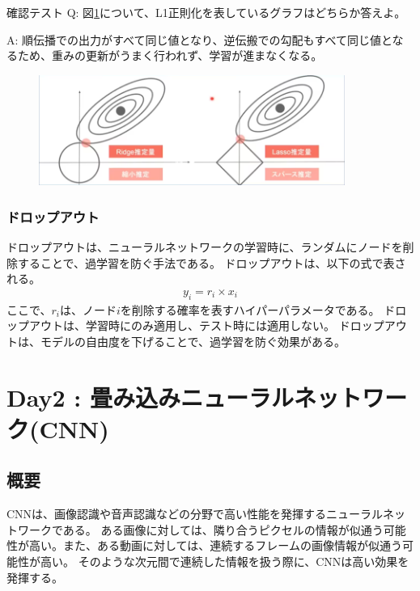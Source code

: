 \documentclass{ltjsarticle}
\begin{document}
\begin{itembox}[l]{確認テスト}
  Q: 図\ref{fig:day2_18_1}について、L1正則化を表しているグラフはどちらか答えよ。

  A: 順伝播での出力がすべて同じ値となり、逆伝搬での勾配もすべて同じ値となるため、重みの更新がうまく行われず、学習が進まなくなる。
\end{itembox}

\begin{figure}
  \centering
  \includegraphics[width=10cm]{./capture/confirm_test/day2_18_1.png}
  \caption{}
  \label{fig:day2_18_1}
\end{figure}

\subsubsection{ドロップアウト}
ドロップアウトは、ニューラルネットワークの学習時に、ランダムにノードを削除することで、過学習を防ぐ手法である。
ドロップアウトは、以下の式で表される。
\begin{align}
  y_i = r_i \times x_i
\end{align}
ここで、$r_i$は、ノード$i$を削除する確率を表すハイパーパラメータである。
ドロップアウトは、学習時にのみ適用し、テスト時には適用しない。
ドロップアウトは、モデルの自由度を下げることで、過学習を防ぐ効果がある。


\newpage
\section{Day2 : 畳み込みニューラルネットワーク(CNN)}
\subsection{概要}
CNNは、画像認識や音声認識などの分野で高い性能を発揮するニューラルネットワークである。
ある画像に対しては、隣り合うピクセルの情報が似通う可能性が高い。また、ある動画に対しては、連続するフレームの画像情報が似通う可能性が高い。
そのような次元間で連続した情報を扱う際に、CNNは高い効果を発揮する。
\end{document}
